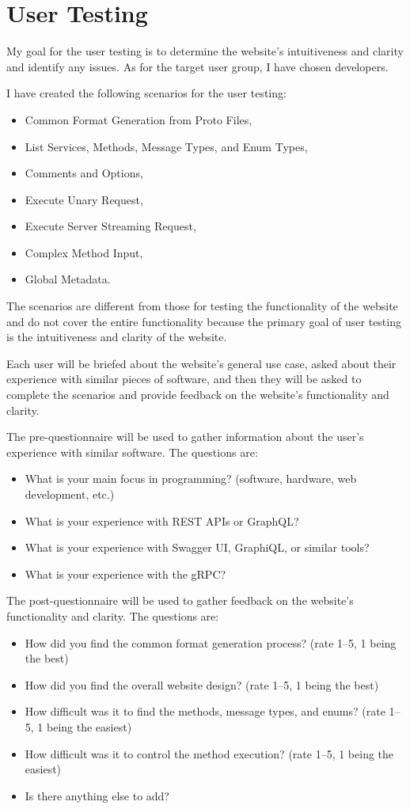 \section{User Testing}
My goal for the user testing is to determine the website's intuitiveness and clarity and identify any issues.
As for the target user group, I have chosen developers.

I have created the following scenarios for the user testing:
\begin{itemize}
    \item Common Format Generation from Proto Files,
    \item List Services, Methods, Message Types, and Enum Types,
    \item Comments and Options,
    \item Execute Unary Request,
    \item Execute Server Streaming Request,
    \item Complex Method Input,
    \item Global Metadata.
\end{itemize}

The scenarios are different from those for testing the functionality of the website
and do not cover the entire functionality
because the primary goal of user testing is the intuitiveness and clarity of the website.

Each user will be briefed about the website's general use case,
asked about their experience with similar pieces of software,
and then they will be asked to complete the scenarios
and provide feedback on the website's functionality and clarity.

The pre-questionnaire will be used to gather information about the user's experience with similar software.
The questions are:
\begin{itemize}
    \item What is your main focus in programming?
    (software, hardware, web development, etc.)
    \item What is your experience with REST APIs or GraphQL?
    \item What is your experience with Swagger UI, GraphiQL, or similar tools?
    \item What is your experience with the gRPC?
\end{itemize}

The post-questionnaire will be used to gather feedback on the website's functionality and clarity.
The questions are:
\begin{itemize}
    \item How did you find the common format generation process?
    (rate 1--5, 1 being the best)
    \item How did you find the overall website design?
    (rate 1--5, 1 being the best)
    \item How difficult was it to find the methods, message types, and enums?
    (rate 1--5, 1 being the easiest)
    \item How difficult was it to control the method execution?
    (rate 1--5, 1 being the easiest)
    \item Is there anything else to add?
\end{itemize}

